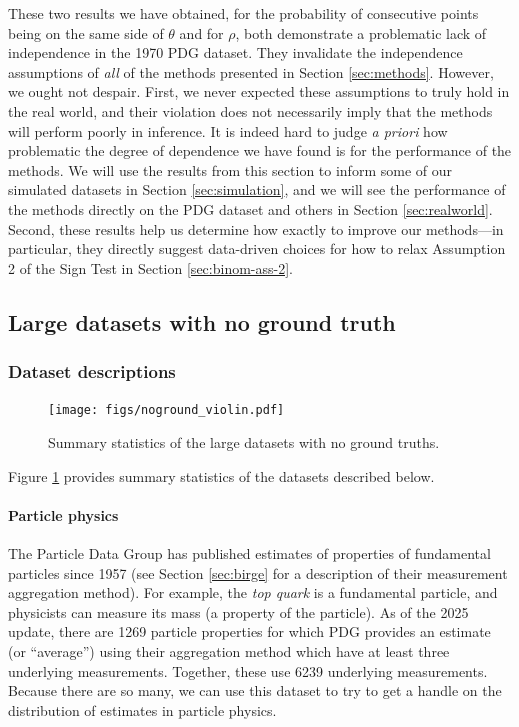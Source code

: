 \documentclass[letterpaper,12pt]{article}
\begin{document}
These two results we have obtained, for the probability of consecutive points being on the same side of $\theta$ and for $\rho$, both demonstrate a problematic lack of independence in the 1970 PDG dataset. They invalidate the independence assumptions of \textit{all} of the methods presented in Section \ref{sec:methods}. However, we ought not despair. First, we never expected these assumptions to truly hold in the real world, and their violation does not necessarily imply that the methods will perform poorly in inference. It is indeed hard to judge \textit{a priori} how problematic the degree of dependence we have found is for the performance of the methods. We will use the results from this section to inform some of our simulated datasets in Section \ref{sec:simulation}, and we will see the performance of the methods directly on the PDG dataset and others in Section \ref{sec:realworld}. Second, these results help us determine how exactly to improve our methods---in particular, they directly suggest data-driven choices for how to relax Assumption 2 of the Sign Test in Section \ref{sec:binom-ass-2}. 

\subsection{Large datasets with no ground truth}\label{fundamental-particles}

\subsubsection{Dataset descriptions}

\begin{figure}[htbp]
  \centering
  \texttt{[image: figs/noground\_violin.pdf]}
  \caption{Summary statistics of the large datasets with no ground truths.}\label{fig:noground-violin}
\end{figure}

Figure \ref{fig:noground-violin} provides summary statistics of the datasets described below.

\paragraph{Particle physics} The Particle Data Group has published estimates of properties of fundamental particles since 1957 (see Section \ref{sec:birge} for a description of their measurement aggregation method). For example, the \emph{top quark} is a fundamental particle, and physicists can measure its mass (a property of the particle). As of the 2025 update, there are 1269 particle properties for which PDG provides an estimate (or ``average'') using their aggregation method which have at least three underlying measurements. Together, these use 6239 underlying measurements. Because there are so many, we can use this dataset to try to get a handle on the distribution of estimates in particle physics.
\end{document}

